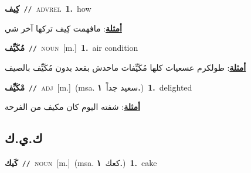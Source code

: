 \documentclass[10pt,a4paper,twoside]{article} %
\begin{document}
\begin{multicols}{2}
{\setlength\topsep{0pt}\textbf{\foreignlanguage{arabic}{كِيف}}\ {\color{gray}\texttt{//}\color{black}}\ \textsc{adv\textunderscore rel}\ \textbf{1.}~how\  \begin{flushright}\color{gray}\foreignlanguage{arabic}{\textbf{\underline{\foreignlanguage{arabic}{أمثلة}}}: مافهمت كِيف تركها آخر شي}\end{flushright}\color{black}} \vspace{2mm}

{\setlength\topsep{0pt}\textbf{\foreignlanguage{arabic}{مُكَيِّف}}\ {\color{gray}\texttt{//}\color{black}}\ \textsc{noun}\ [m.]\ \textbf{1.}~air condition\  \begin{flushright}\color{gray}\foreignlanguage{arabic}{\textbf{\underline{\foreignlanguage{arabic}{أمثلة}}}: طولكرم عسعيات كلها مُكَيِّفات ماحدش بقعد بدون مُكَيِّف بالصيف}\end{flushright}\color{black}} \vspace{2mm}

{\setlength\topsep{0pt}\textbf{\foreignlanguage{arabic}{مْكَيِّف}}\ {\color{gray}\texttt{//}\color{black}}\ \textsc{adj}\ [m.]\ \color{gray}(msa. \foreignlanguage{arabic}{سعيد جداً}~\foreignlanguage{arabic}{\textbf{١.}})\color{black}\ \textbf{1.}~delighted\  \begin{flushright}\color{gray}\foreignlanguage{arabic}{\textbf{\underline{\foreignlanguage{arabic}{أمثلة}}}: شفته اليوم كان مكيف من الفرحة}\end{flushright}\color{black}} \vspace{2mm}

\vspace{-3mm}
\subsection*{\color{blue}\foreignlanguage{arabic}{ك.ي.ك}\color{blue}{}} 

{\setlength\topsep{0pt}\textbf{\foreignlanguage{arabic}{كَيك}}\ {\color{gray}\texttt{//}\color{black}}\ \textsc{noun}\ [m.]\ \color{gray}(msa. \foreignlanguage{arabic}{كعك}~\foreignlanguage{arabic}{\textbf{١.}})\color{black}\ \textbf{1.}~cake\ } \vspace{2mm}


\end{multicols}
\end{document}
